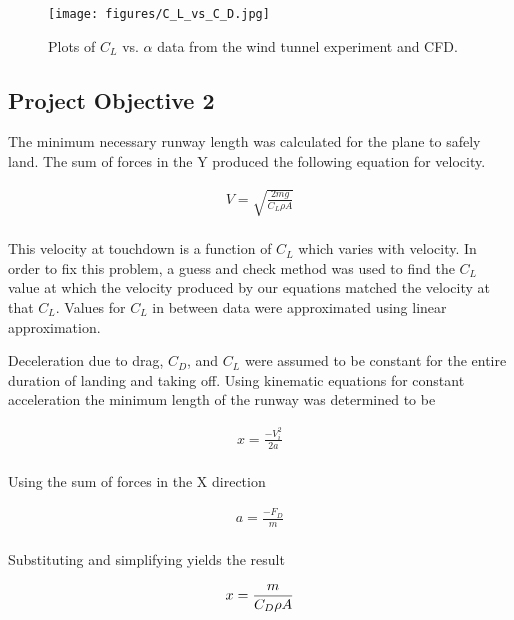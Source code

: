 \documentclass[
	12pt, %
]{refrigeration_report_style}
\begin{document}
\begin{figure}[H]%
    \centering
    {{\texttt{[image: figures/C\_L\_vs\_C\_D.jpg]} }}%
    \caption{Plots of $C_L$ vs. $\alpha$ data from the wind tunnel experiment and CFD.}
    \label{fig:C_L_vs_C_D}%
\end{figure}  

\subsection{Project Objective 2}
The minimum necessary runway length was calculated for the plane to safely land. The sum of forces in the Y produced the following equation for velocity.

\begin{align*}
    V = \sqrt{\frac{2mg}{C_{L}\rho A}} \\
\end{align*}

\noindent This velocity at touchdown is a function of $C_L$ which varies with velocity. In order to fix this problem, a guess and check method was used to find the $C_L$ value at which the velocity produced by our equations matched the velocity at that $C_L$. Values for $C_L$ in between data were approximated using linear approximation. 

\par
\bigskip

\noindent Deceleration due to drag, $C_D$, and $C_L$ were assumed to be constant for the entire duration of landing and taking off. Using kinematic equations for constant acceleration the minimum length of the runway was determined to be 

\begin{align*}
    x = \frac{-V_{i}^{2}}{2a} \\
\end{align*}

\noindent Using the sum of forces in the X direction 

\begin{align*}
    a = \frac{-F_{D}}{m} \\
\end{align*}

\noindent Substituting and simplifying yields the result

\begin{equation}
    x = \frac{m}{C_{D}\rho A} 
    \label{eq:x} \\
\end{equation}
\vspace{2mm}
\end{document}
